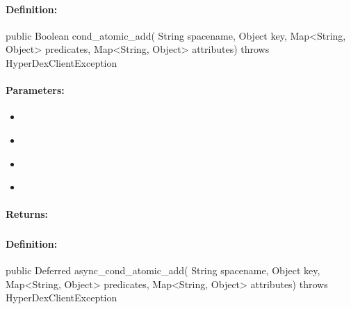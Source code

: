 \paragraph{Definition:}
\begin{javacode}
public Boolean cond_atomic_add(
        String spacename,
        Object key,
        Map<String, Object> predicates,
        Map<String, Object> attributes) throws HyperDexClientException
\end{javacode}

\paragraph{Parameters:}
\begin{itemize}[noitemsep]
\item {}\\

\item {}\\

\item {}\\

\item {}\\

\end{itemize}

\paragraph{Returns:}


\pagebreak
\subsubsection{}
\label{api:java:async_cond_atomic_add}


\paragraph{Definition:}
\begin{javacode}
public Deferred async_cond_atomic_add(
        String spacename,
        Object key,
        Map<String, Object> predicates,
        Map<String, Object> attributes) throws HyperDexClientException
\end{javacode}

